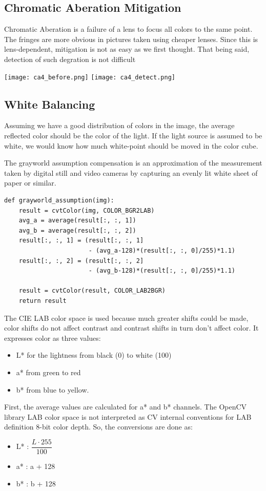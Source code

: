 \documentclass[a4paper,12pt]{article}
\begin{document}
\subsection{Chromatic Aberation Mitigation}
Chromatic Aberation is a failure of a lens to focus all colors to the same point.
The fringes are more obvious in pictures taken using cheaper lenses.
Since this is lens-dependent, mitigation is not as easy as we first thought.
That being said, detection of such degration is not difficult
\begin{center}
  \texttt{[image: ca4\_before.png]}
  \texttt{[image: ca4\_detect.png]}
\end{center}

\subsection{White Balancing}
Assuming we have a good distribution of colors in the image, the average
reflected color should be the color of the light. If the light source is
assumed to be white, we would know how much white-point should be moved in the
color cube.

The grayworld assumption compensation is an approximation of the measurement
taken by digital still and video cameras by capturing an evenly lit white sheet
of paper or similar.
\begin{verbatim}
def grayworld_assumption(img):
    result = cvtColor(img, COLOR_BGR2LAB)
    avg_a = average(result[:, :, 1])
    avg_b = average(result[:, :, 2])
    result[:, :, 1] = (result[:, :, 1]
                       - (avg_a-128)*(result[:, :, 0]/255)*1.1)
    result[:, :, 2] = (result[:, :, 2]
                       - (avg_b-128)*(result[:, :, 0]/255)*1.1)

    result = cvtColor(result, COLOR_LAB2BGR)
    return result
\end{verbatim}

The CIE LAB color space is used because much greater shifts could be made,
color shifts do not affect contrast and contrast shifts in turn don't affect
color. It expresses color as three values:
\begin{itemize}
  \item L* for the lightness from black (0) to white (100)
  \item a* from green to red
  \item b* from blue to yellow.
\end{itemize}

First, the average values are calculated for a* and b* channels. The OpenCV
library LAB color space is not interpreted as CV internal conventions for LAB
definition 8-bit color depth. So, the conversions are done as:
\begin{itemize}
  \item L* : $\dfrac{L \cdot 255}{100}$
  \item a* : a + 128
  \item b* : b + 128
\end{itemize}
\end{document}
